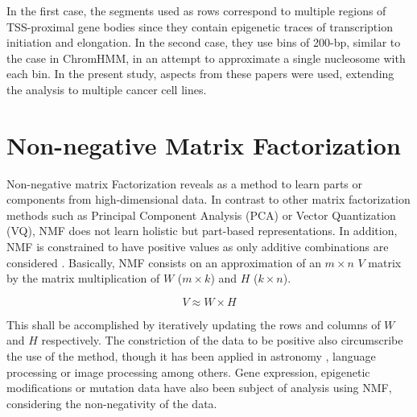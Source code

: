 \medskip

In the first case, the segments used as rows correspond to multiple regions of TSS-proximal gene bodies since they contain epigenetic traces of transcription initiation and elongation. In the second case, they use bins of 200-bp, similar to the case in ChromHMM, in an attempt to approximate a single nucleosome with each bin. In the present study, aspects from these papers were used, extending the analysis to multiple cancer cell lines.


\section{Non-negative Matrix Factorization}

Non-negative matrix Factorization reveals as a method to learn parts or components from high-dimensional data. In contrast to other matrix factorization methods such as Principal Component Analysis (PCA) or Vector Quantization (VQ), NMF does not learn holistic but part-based representations. In addition, NMF is constrained to have positive values as only additive combinations are considered \cite{Lee1999}. Basically, NMF consists on an approximation of an \(m \times n\) \(V\) matrix by the matrix multiplication of \(W\) (\(m \times k\)) and \(H\) (\(k \times n\)).

\begin{equation}
    V \approx W \times H
\end{equation}

This shall be accomplished by iteratively updating the rows and columns of \(W\) and \(H\) respectively. The constriction of the data to be positive also circumscribe the use of the method, though it has been applied in astronomy \cite{Ren2017}, language processing \cite{Bertin2010} or image processing \cite{Yang2007} among others. Gene expression, epigenetic modifications or mutation data have also been subject of analysis using NMF, considering the non-negativity of the data.

\medskip

